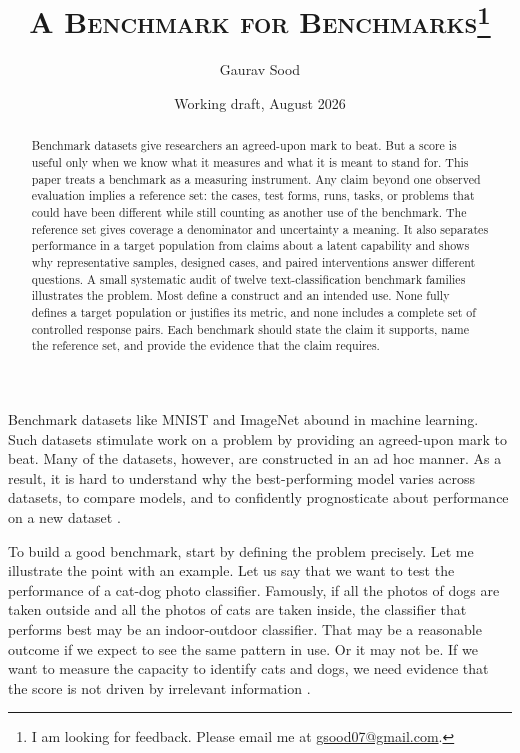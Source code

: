 \documentclass[11pt]{article}
\title{\scshape A Benchmark for Benchmarks\thanks{I am looking for feedback. Please email me at \href{mailto:gsood07@gmail.com}{gsood07@gmail.com}.}}
\author{Gaurav Sood}
\date{Working draft, August 2026}
\begin{document}

\maketitle

\begin{abstract}
Benchmark datasets give researchers an agreed-upon mark to beat. But a score is useful only when we know what it measures and what it is meant to stand for. This paper treats a benchmark as a measuring instrument. Any claim beyond one observed evaluation implies a reference set: the cases, test forms, runs, tasks, or problems that could have been different while still counting as another use of the benchmark. The reference set gives coverage a denominator and uncertainty a meaning. It also separates performance in a target population from claims about a latent capability and shows why representative samples, designed cases, and paired interventions answer different questions. A small systematic audit of twelve text-classification benchmark families illustrates the problem. Most define a construct and an intended use. None fully defines a target population or justifies its metric, and none includes a complete set of controlled response pairs. Each benchmark should state the claim it supports, name the reference set, and provide the evidence that the claim requires.
\end{abstract}

Benchmark datasets like MNIST and ImageNet abound in machine learning. Such datasets stimulate work on a problem by providing an agreed-upon mark to beat. Many of the datasets, however, are constructed in an ad hoc manner. As a result, it is hard to understand why the best-performing model varies across datasets, to compare models, and to confidently prognosticate about performance on a new dataset \citep{dehghani2021benchmark,bouthillier2021variance}.

To build a good benchmark, start by defining the problem precisely. Let me illustrate the point with an example. Let us say that we want to test the performance of a cat-dog photo classifier. Famously, if all the photos of dogs are taken outside and all the photos of cats are taken inside, the classifier that performs best may be an indoor-outdoor classifier. That may be a reasonable outcome if we expect to see the same pattern in use. Or it may not be. If we want to measure the capacity to identify cats and dogs, we need evidence that the score is not driven by irrelevant information \citep{cronbach1955construct}.
\end{document}
